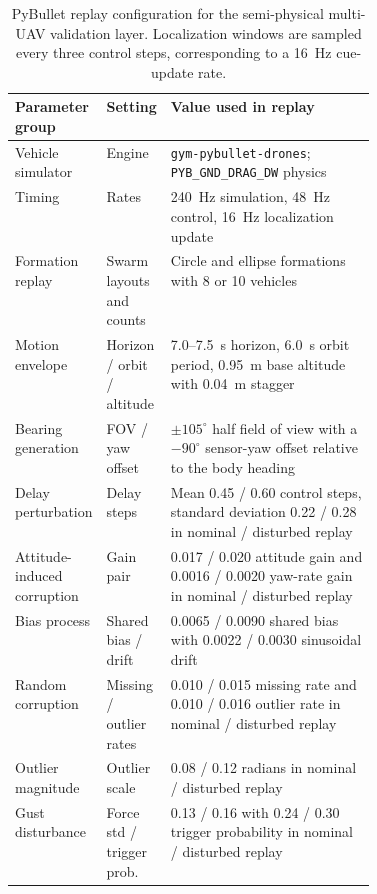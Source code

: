 \begin{table}[!htbp]
\centering
\caption{PyBullet replay configuration for the semi-physical multi-UAV validation layer. Localization windows are sampled every three control steps, corresponding to a 16~Hz cue-update rate.}
\label{tab:pybulletparams}
\small
\setlength{\tabcolsep}{4pt}
\begin{tabularx}{\linewidth}{>{\RaggedRight\arraybackslash}p{0.25\linewidth} >{\RaggedRight\arraybackslash}p{0.17\linewidth} X}
\toprule
Parameter group & Setting & Value used in replay \\
\midrule
Vehicle simulator & Engine & \texttt{gym-pybullet-drones}; \texttt{PYB\_GND\_DRAG\_DW} physics \\
Timing & Rates & 240~Hz simulation, 48~Hz control, 16~Hz localization update \\
Formation replay & Swarm layouts and counts & Circle and ellipse formations with 8 or 10 vehicles \\
Motion envelope & Horizon / orbit / altitude & 7.0--7.5~s horizon, 6.0~s orbit period, 0.95~m base altitude with 0.04~m stagger \\
Bearing generation & FOV / yaw offset & $\pm 105^\circ$ half field of view with a $-90^\circ$ sensor-yaw offset relative to the body heading \\
Delay perturbation & Delay steps & Mean 0.45 / 0.60 control steps, standard deviation 0.22 / 0.28 in nominal / disturbed replay \\
Attitude-induced corruption & Gain pair & 0.017 / 0.020 attitude gain and 0.0016 / 0.0020 yaw-rate gain in nominal / disturbed replay \\
Bias process & Shared bias / drift & 0.0065 / 0.0090 shared bias with 0.0022 / 0.0030 sinusoidal drift \\
Random corruption & Missing / outlier rates & 0.010 / 0.015 missing rate and 0.010 / 0.016 outlier rate in nominal / disturbed replay \\
Outlier magnitude & Outlier scale & 0.08 / 0.12 radians in nominal / disturbed replay \\
Gust disturbance & Force std / trigger prob. & 0.13 / 0.16 with 0.24 / 0.30 trigger probability in nominal / disturbed replay \\
\bottomrule
\end{tabularx}
\end{table}
